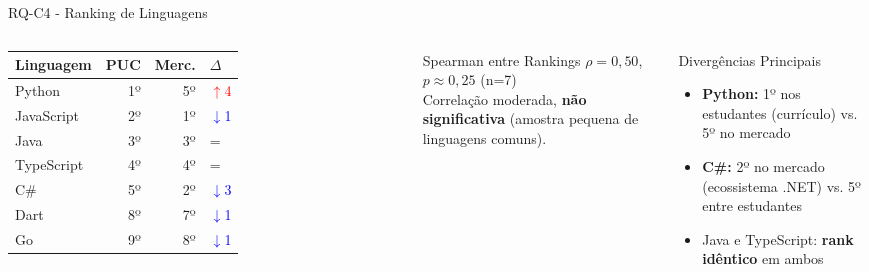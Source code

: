 \documentclass[fleqn]{beamer}
\begin{document}
\begin{frame}{RQ-C4 - Ranking de Linguagens}
\begin{columns}[T]
\begin{table}[H]
\centering
\scriptsize
\begin{tabular}{lrrl}
\toprule
\textbf{Linguagem} & \textbf{PUC} & \textbf{Merc.} & \textbf{$\Delta$} \\
\midrule
Python & 1º & 5º & \textcolor{red}{$\uparrow$4} \\
JavaScript & 2º & 1º & \textcolor{blue}{$\downarrow$1} \\
Java & 3º & 3º & = \\
TypeScript & 4º & 4º & = \\
C\# & 5º & 2º & \textcolor{blue}{$\downarrow$3} \\
Dart & 8º & 7º & \textcolor{blue}{$\downarrow$1} \\
Go & 9º & 8º & \textcolor{blue}{$\downarrow$1} \\
\bottomrule
\end{tabular}
\end{table}

\begin{block}{Spearman entre Rankings}
$\rho = 0{,}50$, $p \approx 0{,}25$ (n=7)\\[0.3cm]
Correlação moderada, \textbf{não significativa} (amostra pequena de linguagens comuns).
\end{block}

\begin{exampleblock}{Divergências Principais}
\scriptsize
\begin{itemize}
    \item \textbf{Python:} 1º nos estudantes (currículo) vs. 5º no mercado
    \item \textbf{C\#:} 2º no mercado (ecossistema .NET) vs. 5º entre estudantes
    \item Java e TypeScript: \textbf{rank idêntico} em ambos
\end{itemize}
\end{exampleblock}
\end{columns}
\end{frame}
\end{document}
